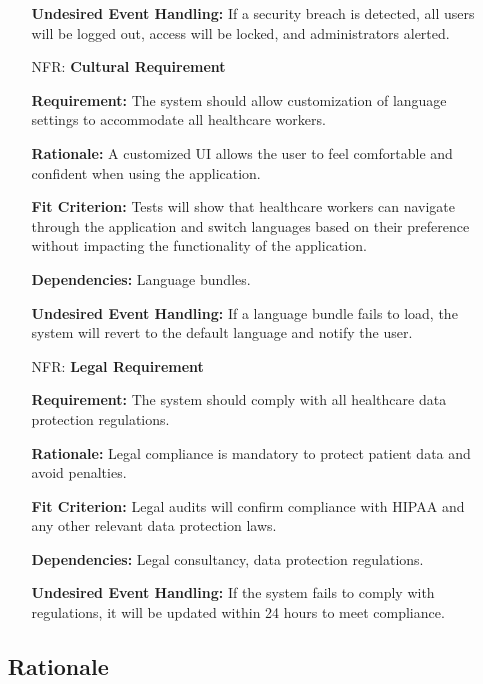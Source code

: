 \documentclass[12pt]{article}
\newcounter{nfrnum} %
\begin{document}
\begin{itemize}
\begin{itemize}
    \textbf{Undesired Event Handling:} If a security breach is detected, all users will be logged out, access will be locked, and administrators alerted.

\item[NFR\refstepcounter{nfrnum}\thenfrnum \label{NFR_Cultural}:] \textbf{Cultural Requirement}

    \textbf{Requirement:} The system should allow customization of language settings to accommodate all healthcare workers.

    \textbf{Rationale:} A customized UI allows the user to feel comfortable and confident when using the application.

    \textbf{Fit Criterion:} Tests will show that healthcare workers can navigate through the application and switch languages based on their preference without impacting the functionality of the application.

    \textbf{Dependencies:} Language bundles.  

    \textbf{Undesired Event Handling:} If a language bundle fails to load, the system will revert to the default language and notify the user.

\item[NFR\refstepcounter{nfrnum}\thenfrnum \label{NFR_Legal}:] \textbf{Legal Requirement}

    \textbf{Requirement:} The system should comply with all healthcare data protection regulations. 

    \textbf{Rationale:} Legal compliance is mandatory to protect patient data and avoid penalties.  

    \textbf{Fit Criterion:} Legal audits will confirm compliance with HIPAA and any other relevant data protection laws.  

    \textbf{Dependencies:} Legal consultancy, data protection regulations.  

    \textbf{Undesired Event Handling:} If the system fails to comply with regulations, it will be updated within 24 hours to meet compliance.

\end{itemize}

\subsection{Rationale}



\end{itemize}
\end{document}
